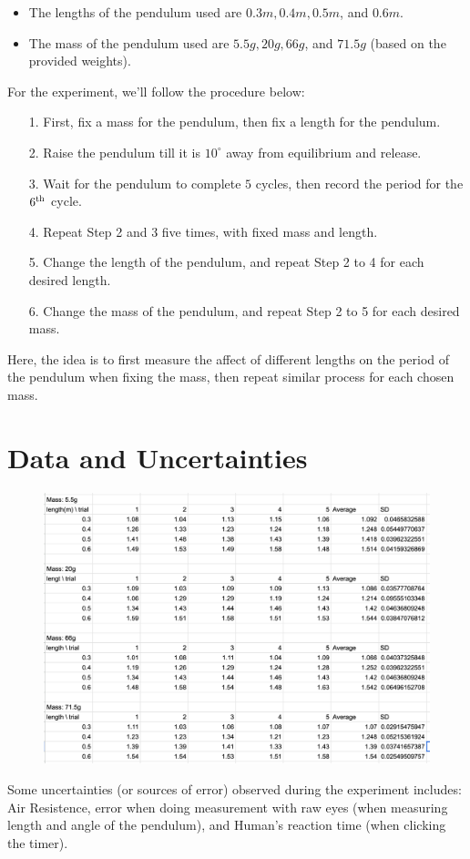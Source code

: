 \documentclass{article}
\begin{document}
\begin{itemize}
    \item The lengths of the pendulum used are $0.3m, 0.4m, 0.5m$, and $0.6m$. 
    \item The mass of the pendulum used are $5.5g, 20g, 66g$, and $71.5g$ (based on the provided weights). 
\end{itemize}
For the experiment, we'll follow the procedure below:
\begin{itemize}
    \item[1.] First, fix a mass for the pendulum, then fix a length for the pendulum.
    \item[2.] Raise the pendulum till it is $10^\circ$ away from equilibrium and release.
    \item[3.] Wait for the pendulum to complete $5$ cycles, then record the period for the $6^\textmd{th}$ cycle.
    \item[4.] Repeat Step 2 and 3 five times, with fixed mass and length.
    \item[5.] Change the length of the pendulum, and repeat Step 2 to 4 for each desired length.
    \item[6.] Change the mass of the pendulum, and repeat Step 2 to 5 for each desired mass.
\end{itemize}
Here, the idea is to first measure the affect of different lengths on the period of the pendulum when fixing the mass, then repeat similar process for each chosen mass.

\section{Data and Uncertainties}
\begin{figure}[h!]
    \begin{center}
        \includegraphics[width=150mm]{data.png}
    \end{center}
\end{figure}
Some uncertainties (or sources of error) observed during the experiment includes: Air Resistence, error when doing measurement with raw eyes (when measuring length and angle of the pendulum), and Human's reaction time (when clicking the timer).
\end{document}
